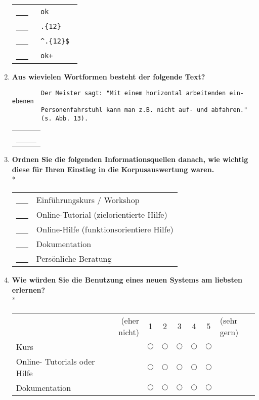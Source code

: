 \begin{enumerate}
{			\begin{tabular}{c l}
				\underline{\ \ \ } & \verb! ok ! \\
				\underline{\ \ \ } & \verb! .{12} ! \\
				\underline{\ \ \ } & \verb! ^.{12}$ ! \\
				\underline{\ \ \ } & \verb! ok+ !
			\end{tabular}
	}
	
	\item{
		\textbf{Aus wievielen Wortformen besteht der folgende Text?}
		\begin{verbatim}
		Der Meister sagt: "Mit einem horizontal arbeitenden ein-ebenen 
		Personenfahrstuhl kann man z.B. nicht auf- und abfahren." 
		(s. Abb. 13).
		\end{verbatim}

			\begin{tabular}{l}
				\underline{\ \ \ \ \ }
			\end{tabular}
	}
	
	\item{
		\textbf{Ordnen Sie die folgenden Informationsquellen danach, wie wichtig diese für Ihren Einstieg in die Korpusauswertung waren.}\\*
		
		\begin{tabular}{c l}
			\underline{\ \ \ } & Einführungskurs / Workshop \\
			\underline{\ \ \ } & Online-Tutorial (zielorientierte Hilfe) \\
			\underline{\ \ \ } & Online-Hilfe (funktionsorientiere Hilfe) \\
			\underline{\ \ \ } & Dokumentation \\
			\underline{\ \ \ } & Persönliche Beratung
		\end{tabular}
	}
	
	\item{
		\textbf{Wie würden Sie die Benutzung eines neuen Systems am liebsten erlernen?}\\*
		
		\begin{center}
			\begin{tabular}{l r c c c c c l}
				& (eher nicht) & 1 & 2 & 3 & 4 & 5 & (sehr gern) \\
				Kurs & & $\bigcirc$ & $\bigcirc$ & $\bigcirc$ & $\bigcirc$ & $\bigcirc$ \\ \hline
				Online- Tutorials oder Hilfe & & $\bigcirc$ & $\bigcirc$ & $\bigcirc$ & $\bigcirc$ & $\bigcirc$ \\ \hline
				Dokumentation & & $\bigcirc$ & $\bigcirc$ & $\bigcirc$ & $\bigcirc$ & $\bigcirc$	\\ \hline	
			\end{tabular}
		\end{center}
	}
	

\end{enumerate}
